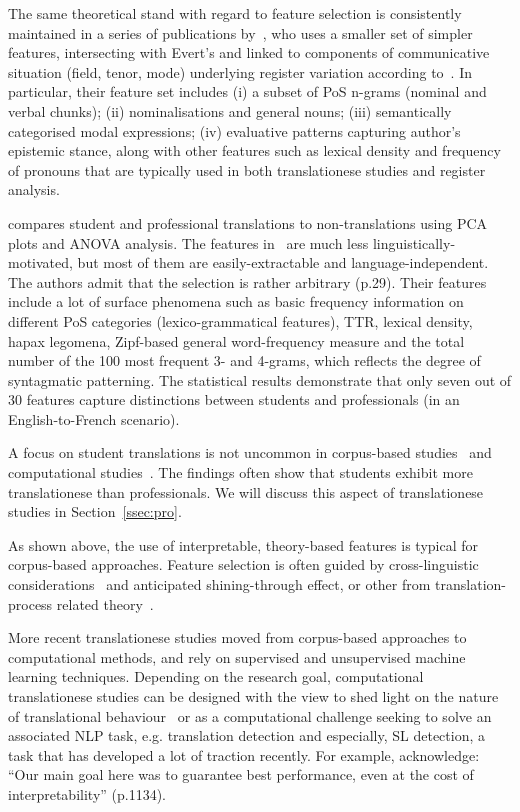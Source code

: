 The same theoretical stand with regard to feature selection is consistently maintained in a series of publications by~\citet{Lapshinova2015,Lapshinova2017}, who uses a smaller set of simpler features, intersecting with Evert's and linked to components of communicative situation (field, tenor, mode) underlying register variation according to~\citet{Halliday1989}. In particular, their feature set includes (i) a subset of PoS n-grams (nominal and verbal chunks); (ii) nominalisations and general nouns; (iii) semantically categorised modal expressions; (iv) evaluative patterns capturing author's epistemic stance, along with other features such as lexical density and frequency of pronouns that are typically used in both translationese studies and register analysis.

\citet{Sutter2017} compares student and professional translations to non-translations using \gls{PCA} plots and \gls{ANOVA} analysis. The features in~\citet{Sutter2017} are much less linguistically-motivated, but most of them are easily-extractable and language-independent. The authors admit that the selection is rather arbitrary (p.29). \hypertarget{wd:sutters}{Their features} include a lot of surface phenomena such as basic frequency information on different PoS categories (lexico-grammatical features), TTR, lexical density, hapax legomena, Zipf-based general word-frequency measure and the total number of the 100 most frequent 3- and 4-grams, which reflects the degree of syntagmatic patterning. The statistical results demonstrate that only seven out of 30 features capture distinctions between students and professionals (in an English-to-French scenario).

A focus on student translations is not uncommon in corpus-based studies~\cite{Nakamura2007,Rabadan2009, Castagnoli2009,Sutter2017,Kunilovskaya2018profiles} and computational studies~\cite{Ilisei2010,Lapshinova2019,Bizzoni2021}. The findings often show that students exhibit more translationese than professionals. We will discuss this aspect of translationese studies in Section~\ref{ssec:pro}.

As shown above, the use of interpretable, theory-based features is typical for corpus-based approaches. Feature selection is often guided by cross-linguistic considerations~\cite[as in][]{Santos1995,Evert2017,Cappelle2017} and anticipated shining-through effect, or other from translation-process related theory~\cite{Redelinghuys2015,Redelinghuys2016,Delaere2015}. 

More recent translationese studies moved from corpus-based approaches to computational methods, and rely on supervised and unsupervised machine learning techniques. 
Depending on the research goal, computational translationese studies can be designed with the view to shed light on the nature of translational behaviour~\cite[see, for example, ][]{Corpas2008,Ilisei2010} or as a computational challenge seeking to solve an associated NLP task, e.g. translation detection and especially, SL detection, a task that has developed a lot of traction recently. For example, \citet{Sominsky2019} acknowledge: ``Our main goal here was to guarantee best performance, even at the cost of interpretability'' (p.1134).

